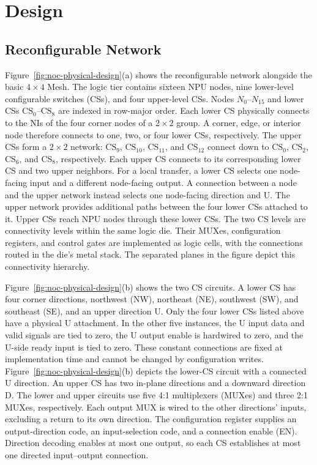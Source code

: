 \documentclass[conference,10pt]{IEEEtran}
\begin{document}
\section{Design}
\label{sec:design}

\subsection{Reconfigurable Network}
\label{sec:noc-design}

Figure~\ref{fig:noc-physical-design}(a) shows the reconfigurable network
alongside the basic $4\times4$ Mesh. The logic tier contains sixteen NPU
nodes, nine lower-level configurable switches (CSs), and four upper-level
CSs. Nodes $N_0$--$N_{15}$ and lower CSs $\mathrm{CS}_0$--$\mathrm{CS}_8$
are indexed in row-major order. Each lower CS physically connects to
the NIs of the four corner nodes of a $2\times2$ group. A corner, edge, or interior node
therefore connects to one, two, or four lower CSs, respectively.
The upper CSs form a $2\times2$ network:
$\mathrm{CS}_9$, $\mathrm{CS}_{10}$, $\mathrm{CS}_{11}$, and
$\mathrm{CS}_{12}$ connect down to $\mathrm{CS}_0$, $\mathrm{CS}_2$,
$\mathrm{CS}_6$, and $\mathrm{CS}_8$, respectively.
Each upper CS connects to its corresponding lower CS and two upper
neighbors. For a local transfer, a lower CS selects one node-facing
input and a different node-facing output. A connection between a node
and the upper network instead selects one node-facing direction and U.
The upper network provides additional paths between the four lower
CSs attached to it. Upper CSs reach NPU nodes through these lower CSs.
The two CS levels are connectivity levels within the same logic die.
Their MUXes, configuration registers, and control gates are implemented
as logic cells, with the connections routed in the die's metal stack.
The separated planes in the figure depict this connectivity hierarchy.

Figure~\ref{fig:noc-physical-design}(b) shows the two CS circuits.
A lower CS has four corner directions, northwest (NW), northeast (NE),
southwest (SW), and southeast (SE), and an upper direction U.
Only the four lower CSs listed above have a physical U attachment.
In the other five instances, the U input data and valid signals are
tied to zero, the U output enable is hardwired to zero, and the
U-side ready input is tied to zero. These constant connections are
fixed at implementation time and cannot be changed by configuration
writes. Figure~\ref{fig:noc-physical-design}(b) depicts the lower-CS
circuit with a connected U direction. An upper CS has two in-plane
directions and a downward direction D. The lower and upper circuits
use five 4:1 multiplexers (MUXes) and three 2:1 MUXes, respectively.
Each output MUX is wired to the other directions' inputs, excluding
a return to its own direction. The configuration register supplies
an output-direction code, an input-selection code, and a connection
enable (EN). Direction decoding enables at most one output, so each
CS establishes at most one directed input--output connection.
\end{document}
